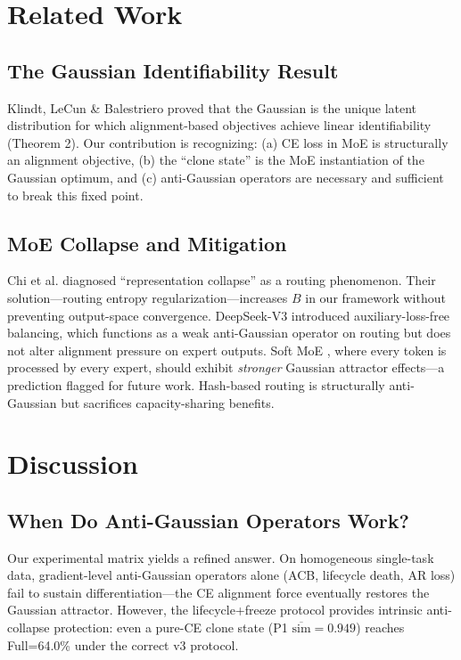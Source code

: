 \documentclass[twoside]{article}
\theoremstyle{definition}
\begin{document}
\section{Related Work}

\subsection{The Gaussian Identifiability Result}

Klindt, LeCun \& Balestriero \cite{klindt2026} proved that the Gaussian is the unique latent distribution for which alignment-based objectives achieve linear identifiability (Theorem 2). Our contribution is recognizing: (a) CE loss in MoE is structurally an alignment objective, (b) the ``clone state'' is the MoE instantiation of the Gaussian optimum, and (c) anti-Gaussian operators are necessary and sufficient to break this fixed point.

\subsection{MoE Collapse and Mitigation}

Chi et al. \cite{chi2022} diagnosed ``representation collapse'' as a routing phenomenon. Their solution---routing entropy regularization---increases $B$ in our framework without preventing output-space convergence. DeepSeek-V3 \cite{deepseek2024} introduced auxiliary-loss-free balancing, which functions as a weak anti-Gaussian operator on routing but does not alter alignment pressure on expert outputs. Soft MoE \cite{puigcerver2023}, where every token is processed by every expert, should exhibit \emph{stronger} Gaussian attractor effects---a prediction flagged for future work. Hash-based routing \cite{roller2021} is structurally anti-Gaussian but sacrifices capacity-sharing benefits.

\section{Discussion}

\subsection{When Do Anti-Gaussian Operators Work?}

Our experimental matrix yields a refined answer. On homogeneous single-task data, gradient-level anti-Gaussian operators alone (ACB, lifecycle death, AR loss) fail to sustain differentiation---the CE alignment force eventually restores the Gaussian attractor. However, the lifecycle+freeze protocol provides intrinsic anti-collapse protection: even a pure-CE clone state (P1 $\overline{\text{sim}}=0.949$) reaches Full=64.0\% under the correct v3 protocol.
\end{document}
